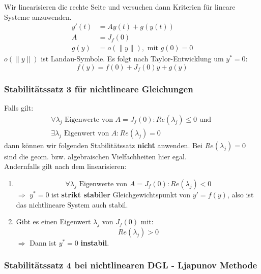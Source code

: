 \documentclass[a4paper]{article}
\begin{document}
Wir linearisieren die rechte Seite und versuchen dann Kriterien für
lineare Systeme anzuwenden.
\begin{align*}
	y' (t) &= A y(t) + g(y(t)) \\
	A &= J_f (0) \\
	g(y) &= o( \| y \| ), 
	\text{ mit } g(0) = 0
\end{align*}
$o( \| y \| )$ ist Landau-Symbole.
Es folgt nach Taylor-Entwicklung um $y^* = 0$:
\[
	f(y) = f( 0 ) + J_f (0) y + g(y)
\] 

\subsubsection{Stabilitätssatz 3 für nichtlineare Gleichungen}
Falls gilt:
\begin{gather*}
	\forall \lambda_j \text{ Eigenwerte von } A = J_f (0):
	Re (\lambda_j) \leq 0
	\text{ und } \\
	\exists \lambda_j \text{ Eigenwert von } A:
	Re (\lambda_j) = 0
\end{gather*}
dann können wir folgenden Stabilitätssatz \textbf{nicht} anwenden.
Bei $Re(\lambda_j) = 0$ sind die geom. bzw. algebraischen Vielfachheiten
hier egal.
\\

Andernfalls gilt nach dem linearisieren:

\begin{enumerate}
	\item 
		\[
			\forall \lambda_j \text{ Eigenwerte von }
			A = J_f (0): Re (\lambda_j) < 0
		\] 
		$\Rightarrow$ $y ^{*} = 0$ ist \textbf{strikt stabiler} 
		Gleichgewichtspunkt von $y' = f(y)$, also ist das nichtlineare
		System auch stabil.
	\item Gibt es einen Eigenwert $\lambda_j$ von $J_f (0)$ mit:
		\[
		Re (\lambda_j) > 0
		\] 
		$\Rightarrow$ Dann ist $y ^{*} = 0$ \textbf{instabil}.
\end{enumerate}

\subsubsection{Stabilitätssatz 4 bei nichtlinearen DGL - Ljapunov Methode}
\end{document}

